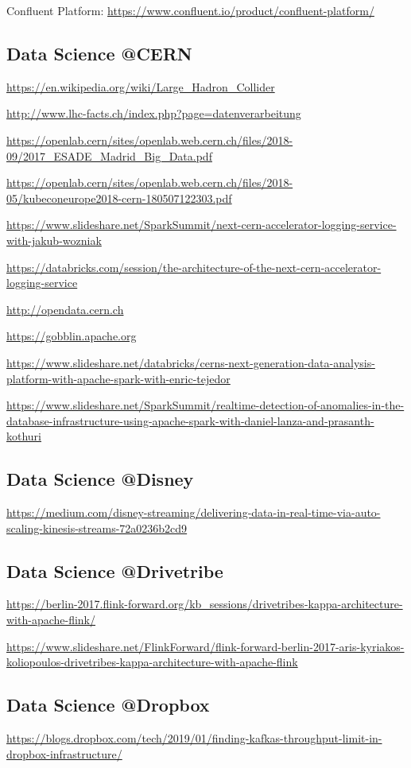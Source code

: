 \documentclass[12pt]{scrartcl} %
\begin{document}
Confluent Platform:
\url{https://www.confluent.io/product/confluent-platform/}


\subsection{Data Science @CERN}
\url{https://en.wikipedia.org/wiki/Large_Hadron_Collider}

\url{http://www.lhc-facts.ch/index.php?page=datenverarbeitung}

\url{https://openlab.cern/sites/openlab.web.cern.ch/files/2018-09/2017_ESADE_Madrid_Big_Data.pdf}

\url{https://openlab.cern/sites/openlab.web.cern.ch/files/2018-05/kubeconeurope2018-cern-180507122303.pdf}

\url{https://www.slideshare.net/SparkSummit/next-cern-accelerator-logging-service-with-jakub-wozniak}

\url{https://databricks.com/session/the-architecture-of-the-next-cern-accelerator-logging-service}

\url{http://opendata.cern.ch}

\url{https://gobblin.apache.org}

\url{https://www.slideshare.net/databricks/cerns-next-generation-data-analysis-platform-with-apache-spark-with-enric-tejedor}

\url{https://www.slideshare.net/SparkSummit/realtime-detection-of-anomalies-in-the-database-infrastructure-using-apache-spark-with-daniel-lanza-and-prasanth-kothuri}


\subsection{Data Science @Disney}
\url{https://medium.com/disney-streaming/delivering-data-in-real-time-via-auto-scaling-kinesis-streams-72a0236b2cd9}

\subsection{Data Science @Drivetribe}
\url{https://berlin-2017.flink-forward.org/kb_sessions/drivetribes-kappa-architecture-with-apache-flink/}

\url{https://www.slideshare.net/FlinkForward/flink-forward-berlin-2017-aris-kyriakos-koliopoulos-drivetribes-kappa-architecture-with-apache-flink}

\subsection{Data Science @Dropbox}
\url{https://blogs.dropbox.com/tech/2019/01/finding-kafkas-throughput-limit-in-dropbox-infrastructure/}
\end{document}
